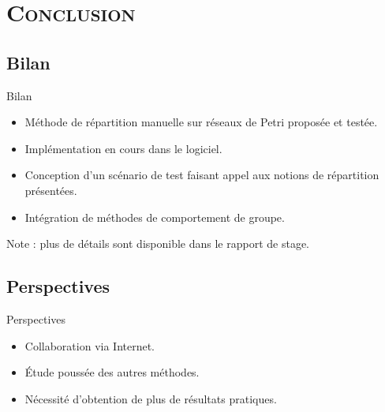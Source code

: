 \section{\scshape Conclusion}
\subsection*{Bilan}
\begin{frame}{Bilan}
	\begin{itemize}
	\item Méthode de répartition manuelle sur réseaux de Petri proposée et testée.
	
	\item Implémentation en cours dans le logiciel.
	
	\item Conception d'un scénario de test faisant appel aux notions de répartition présentées.	
	
	\item Intégration de méthodes de comportement de groupe.	
	\end{itemize}
	
	Note : plus de détails sont disponible dans le rapport de stage.
\end{frame}

\subsection*{Perspectives}
\begin{frame}{Perspectives}
	\begin{itemize}
		\item Collaboration via Internet.
			
		\item Étude poussée des autres méthodes.
			
		\item Nécessité d'obtention de plus de résultats pratiques.
	\end{itemize}
\end{frame}
%
%		
%		
%		
%		

